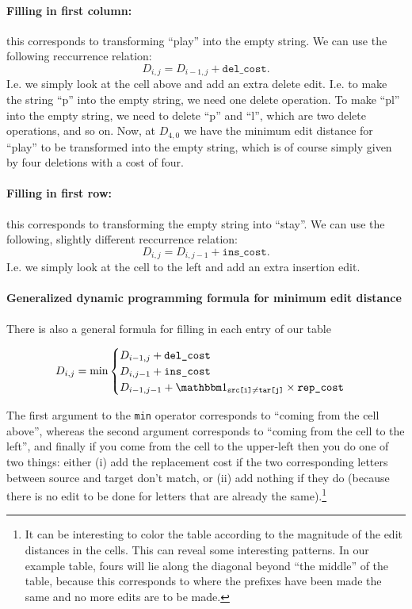 \documentclass[12pt]{article}
\begin{document}
\paragraph{Filling in first column:} this corresponds to transforming ``play'' into the empty string. We can use the following reccurrence relation:
\[
  D_{i,j} = D_{i-1,j} + \texttt{del\_cost}.
\]
I.e. we simply look at the cell above and add an extra delete edit. I.e. to make the string ``p'' into the empty string, we need one delete operation. To make ``pl'' into the empty string, we need to delete ``p'' and ``l'', which are two delete operations, and so on. Now, at $D_{4,0}$ we have the minimum edit distance for ``play'' to be transformed into the empty string, which is of course simply given by four deletions with a cost of four.

\paragraph{Filling in first row:} this corresponds to transforming the empty string into ``stay''. We can use the following, slightly different reccurrence relation:
\[
  D_{i,j} = D_{i,j-1} + \texttt{ins\_cost}.
\]
I.e. we simply look at the cell to the left and add an extra insertion edit.

\paragraph{Generalized dynamic programming formula for minimum edit distance} There is also a general formula for filling in each entry of our table

\[
  D_{i,j} = \min \begin{cases}
    D_{i-1, j} + \texttt{del\_cost} \\
    D_{i, j-1} + \texttt{ins\_cost} \\
    D_{i-1,j-1} + \mathbbm 1_{\texttt{src[i]} \neq \texttt{tar[j]}} \times \texttt{rep\_cost}
  \end{cases}
\]

The first argument to the \texttt{min} operator corresponds to ``coming from the cell above'', whereas the second argument corresponds to ``coming from the cell to the left'', and finally if you come from the cell to the upper-left then you do one of two things: either (i) add the replacement cost if the two corresponding letters between source and target don't match, or (ii) add nothing if they do (because there is no edit to be done for letters that are already the same).\footnote{It can be interesting to color the table according to the magnitude of the edit distances in the cells. This can reveal some interesting patterns. In our example table, fours will lie along the diagonal beyond ``the middle'' of the table, because this corresponds to where the prefixes have been made the same and no more edits are to be made.}
\end{document}
